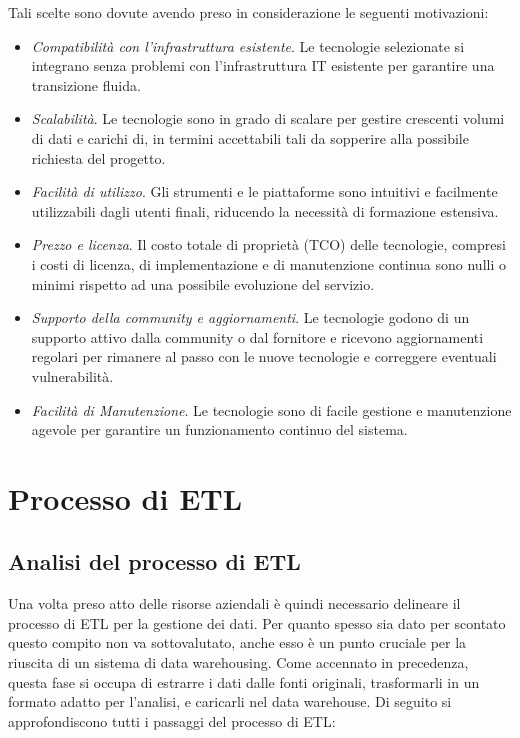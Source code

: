Tali scelte sono dovute avendo preso in considerazione le seguenti motivazioni:
\begin{itemize}
    \item \textit{Compatibilità con l'infrastruttura esistente}. Le tecnologie selezionate si integrano senza problemi con l'infrastruttura IT esistente per garantire una transizione fluida.
    \item \textit{Scalabilità}. Le tecnologie sono in grado di scalare per gestire crescenti volumi di dati e carichi di, in termini accettabili tali da sopperire alla possibile richiesta del progetto.
    \item \textit{Facilità di utilizzo}. Gli strumenti e le piattaforme sono intuitivi e facilmente utilizzabili dagli utenti finali, riducendo la necessità di formazione estensiva.
    \item \textit{Prezzo e licenza}. Il costo totale di proprietà (TCO) delle tecnologie, compresi i costi di licenza, di implementazione e di manutenzione continua sono nulli o minimi rispetto ad una possibile evoluzione del servizio.
    \item \textit{Supporto della community e aggiornamenti}. Le tecnologie godono di un supporto attivo dalla community o dal fornitore e ricevono aggiornamenti regolari per rimanere al passo con le nuove tecnologie e correggere eventuali vulnerabilità.
    \item \textit{Facilità di Manutenzione}. Le tecnologie sono di facile gestione e manutenzione agevole per garantire un funzionamento continuo del sistema.
\end{itemize}

\section{Processo di ETL}

\subsection{Analisi del processo di ETL}

Una volta preso atto delle risorse aziendali è quindi necessario delineare il processo di ETL per la gestione dei dati. Per quanto spesso sia dato per scontato questo compito non va sottovalutato, anche esso è un punto cruciale per la riuscita di un sistema di data warehousing. Come accennato in precedenza, questa fase si occupa di estrarre i dati dalle fonti originali, trasformarli in un formato adatto per l'analisi, e caricarli nel data warehouse. Di seguito si approfondiscono tutti i passaggi del processo di ETL:

